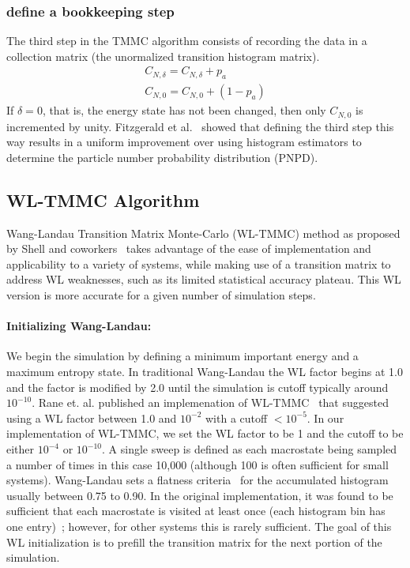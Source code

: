 \documentclass[letterpaper,twocolumn,amsmath,amssymb,pre,aps,10pt]{revtex4-1}
\begin{document}
\subsubsection{define a bookkeeping step}
The third step in the TMMC algorithm consists of recording the data in
a collection matrix (the unormalized transition histogram matrix).
\begin{align}
  C_{N,\delta} = C_{N,\delta} + p_{a}\\
  C_{N,0} = C_{N,0} +(1 - p_{a})
\end{align} If $\delta=0$, that is, the energy state has not been
changed, then only $C_{N,0}$ is incremented by unity. Fitzgerald et
al.~\cite{fitzgerald2000monte} showed that defining the third step this
way results in a uniform improvement over using histogram estimators to
determine the particle number probability distribution (PNPD).

\subsection{WL-TMMC Algorithm}

Wang-Landau Transition Matrix Monte-Carlo (WL-TMMC) method as proposed
by Shell and coworkers~\cite{shell2003improved,shell2004flat} takes
advantage of the ease of implementation and applicability to a variety
of systems, while making use of a transition matrix to address WL
weaknesses, such as its limited statistical accuracy plateau.
This WL version is more accurate for a given number of simulation steps.

\paragraph{Initializing Wang-Landau:} We begin the simulation by
defining a minimum important energy and a maximum entropy state. In
traditional Wang-Landau the WL factor begins at 1.0 and the factor is
modified by 2.0 until the simulation is cutoff typically around
$10^{-10}$.  Rane et. al. published an implemenation of
WL-TMMC~\cite{rane2013monte} that suggested using a WL factor between
1.0 and $10^{-2}$ with a cutoff $<10^{-5}$. In our implementation of
WL-TMMC, we set the WL factor to be 1 and the cutoff to be either
$10^{-4}$ or $10^{-10}$. A single sweep is defined as each macrostate
being sampled a number of times in this case 10,000 (although 100 is
often sufficient for small systems). Wang-Landau sets a flatness
criteria~\cite{wang2001determining, wang2001efficient,
hatch2015computational, mahynski2017predicting} for the accumulated
histogram usually between 0.75 to 0.90.  In the original
implementation, it was found to be sufficient that each macrostate is
visited at least once (each histogram bin has one
entry)~\cite{shell2003improved}; however, for other systems this is
rarely sufficient.  The goal of this WL initialization is to prefill
the transition matrix for the next portion of the simulation.
\end{document}
